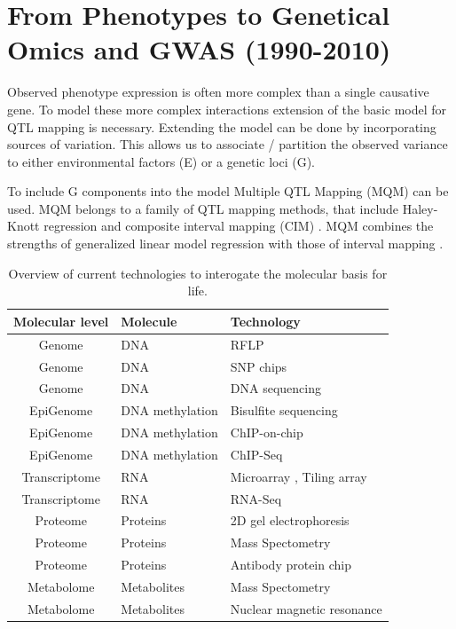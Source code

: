 \section{From Phenotypes to Genetical Omics and GWAS (1990-2010)}

Observed phenotype expression is often more complex than a single causative gene. 
To model these more complex interactions extension of the basic model for QTL mapping is 
necessary. Extending the model can be done by incorporating sources of variation. This allows 
us to associate / partition the observed variance to either environmental factors (E) or a 
genetic loci (G).

To include G components into the model Multiple QTL Mapping (MQM) can be used. MQM belongs 
to a family of QTL mapping methods, that include Haley-Knott regression \cite{Haley:1992} 
and composite interval mapping (CIM) \cite{Zeng:1994}. MQM combines the strengths of 
generalized linear model regression with those of interval mapping \cite{Jansen:1993, Jansen:1994b}. 

\begin{table}[h]
  \centering
  {\footnotesize
  \begin{tabular}{ | c | l | l | }
    \hline
    {\bf Molecular level} & {\bf Molecule} & {\bf Technology}\\
    \hline
    \hline
\rowcolor{gray!35}    Genome          & DNA                & RFLP \cite{Lander:1986} \\
\rowcolor{gray!35}    Genome          & DNA                & SNP chips \cite{Hacia:1999} \\
\rowcolor{gray!35}    Genome          & DNA                & DNA sequencing \cite{Mardis:2008} \\
    \hline
    EpiGenome       & DNA methylation    & Bisulfite sequencing \cite{Hayatsu:2007} \\
    EpiGenome       & DNA methylation    & ChIP-on-chip \cite{Collas:2010} \\
    EpiGenome       & DNA methylation    & ChIP-Seq \cite{Park:2009} \\
    \hline
    \hline
\rowcolor{gray!35}    Transcriptome   & RNA          & Microarray \cite{Lashkari:1997}, Tiling array \cite{Lee:2013} \\
\rowcolor{gray!35}    Transcriptome   & RNA          & RNA-Seq \cite{Wang:2009}\\
    \hline
    Proteome        & Proteins     & 2D gel electrophoresis \cite{O'Farrell:1975}\\
    Proteome        & Proteins     & Mass Spectometry \cite{Deshaies:2001}\\
    Proteome        & Proteins     & Antibody protein chip \cite{Fasolo:2009} \\
    \hline
\rowcolor{gray!35}    Metabolome      & Metabolites  & Mass Spectometry \cite{Aebersold:2003} \\
\rowcolor{gray!35}    Metabolome      & Metabolites  & Nuclear magnetic resonance \cite{Espina:2009} \\
    \hline
  \end{tabular}
  }
  \caption[Overview]{Overview of current technologies to interogate the molecular basis for life.}
\end{table}

